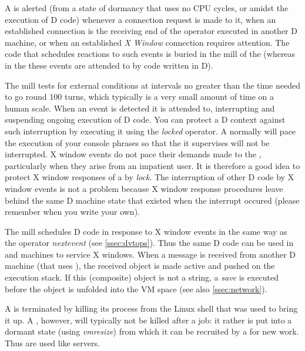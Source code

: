  A  is alerted (from a state of dormancy that uses no CPU cycles, or amidst the execution of D code) whenever a connection request is made to it, when an established connection is the receiving end of the  operator executed in another D machine, or when an established \emph{X Window} connection requires attention. The code that schedules reactions to such events is buried in the mill of the  (whereas in the  these events are attended to by code written in D).

The  mill tests for external conditions at intervals no greater than the time needed to go round 100 turns, which typically is a very small amount of time on a human scale. When an event is detected it is attended to, interrupting and suspending ongoing execution of D code.  You can protect a D context against such interruption by executing it using the \emph{locked} operator. A  normally will pace the execution of your console phrases so that the  it supervises will not be interrupted. X window events do not pace their demands made to the , particularly when they arise from an impatient user. It is therefore a good idea to protect X window responses of a  by \emph{lock}. The interruption of other D code by X window events is not a problem because X window response procedures leave behind the same D machine state that existed when the interrupt occured (please remember when you write your own).

The  mill schedules D code in response to X window events in the same way as the  operator \emph{nextevent} (see \ref{ssec:dvtops}). Thus the same D code can be used in  and  machines to service X windows. When a message is received from another D machine (that uses ), the received object is made active and pushed on the execution stack. If this (composite) object is not a string, a \emph{save} is executed before the object is unfolded into the VM space (see also \ref{ssec:network}).

A  is terminated by killing its process from the Linux shell that was used to bring it up. A , however, will typically not be killed after a job: it rather is put into a dormant state (using \emph{vmresize}) from which it can be recruited by a  for new work. Thus  are used like servers.

